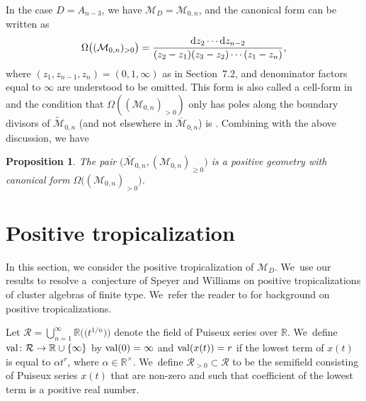 \documentclass[10pt,a4paper]{amsart}
\def\R{{\mathbb R}}
\def\M{{\mathcal{M}}}
\def\tM{{\widetilde {\mathcal{M}}}}
\def\bM{{\overline {\mathcal{M}}}}
\numberwithin{equation}{section}
\newtheorem{Proposition}[Theorem]{Proposition}
\begin{document}
In the case $D=A_{n-3}$, we have $\M_D = \M_{0,n}$, and the canonical form can be written as
\begin{gather*}
\Omega\big((\M_{0,n})_{>0}\big) = \frac{{\rm d}z_2 \cdots {\rm d}z_{n-2}}{(z_2-z_1)(z_3-z_2)\cdots(z_1-z_n)},
\end{gather*}
where $(z_1,z_{n-1},z_n) = (0,1,\infty)$ as in Section~7.2, and denominator factors equal to $\infty$ are understood to be omitted.
This form is also called a cell-form in~\cite{BCS} and the condition that $\Omega((\M_{0,n})_{>0})$ only has poles along the boundary divisors of $\tM_{0,n}$ \big(and not elsewhere in $\bM_{0,n}$\big) is \cite[Proposition~2.7]{BCS}. Combining with the above discussion, we have
{\sloppy\begin{Proposition}
The pair $\big(\bM_{0,n},( \M_{0,n})_{\geq 0}\big)$ is a positive geometry with canonical form $\Omega\big((\M_{0,n})_{>0}\big) $.
\end{Proposition}

}

\section{Positive tropicalization}
\def\RR{{\mathcal R}}
\def\val{{\rm val}}

In this section, we consider the positive tropicalization of $\M_D$. We~use our results to resolve a~conjecture of Speyer and Williams \cite{SW} on positive tropicalizations of cluster algebras of finite type. We~refer the reader to \cite{SW} for background on positive tropicalizations.

Let $\RR = \bigcup_{n=1}^\infty \R\big(\big(t^{1/n}\big)\big) $ denote the field of Puiseux series over $\R$. We~define $\val\colon \RR \to \R \cup \{\infty\}$ by $\val(0) = \infty$ and $\val(x(t)) = r$ if the lowest term of $x(t)$ is equal to $\alpha t^r$, where $\alpha \in \R^\times$. We~define $\RR_{>0} \subset \RR$ to be the semifield consisting of Puiseux series $x(t)$ that are non-zero and such that coefficient of the lowest term is a positive real number.
\end{document}
